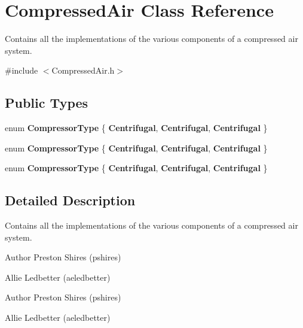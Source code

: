 \hypertarget{class_compressed_air}{}\section{Compressed\+Air Class Reference}
\label{class_compressed_air}


Contains all the implementations of the various components of a compressed air system.  




{\ttfamily \#include $<$Compressed\+Air.\+h$>$}

\subsection*{Public Types}
\begin{DoxyCompactItemize}
\item 
\mbox{\label{class_compressed_air_a344d30b7ebe1d65a4d93edd057b2ea85}} 
enum {\bfseries Compressor\+Type} \{ {\bfseries Centrifugal}, 
{\bfseries Centrifugal}, 
{\bfseries Centrifugal}
 \}
\item 
\mbox{\label{class_compressed_air_a344d30b7ebe1d65a4d93edd057b2ea85}} 
enum {\bfseries Compressor\+Type} \{ {\bfseries Centrifugal}, 
{\bfseries Centrifugal}, 
{\bfseries Centrifugal}
 \}
\item 
\mbox{\label{class_compressed_air_a344d30b7ebe1d65a4d93edd057b2ea85}} 
enum {\bfseries Compressor\+Type} \{ {\bfseries Centrifugal}, 
{\bfseries Centrifugal}, 
{\bfseries Centrifugal}
 \}
\end{DoxyCompactItemize}


\subsection{Detailed Description}
Contains all the implementations of the various components of a compressed air system. 

\begin{DoxyAuthor}{Author}
Preston Shires (pshires) 

Allie Ledbetter (aeledbetter) 
\end{DoxyAuthor}


\begin{DoxyAuthor}{Author}
Preston Shires (pshires) 

Allie Ledbetter (aeledbetter) 
\end{DoxyAuthor}


